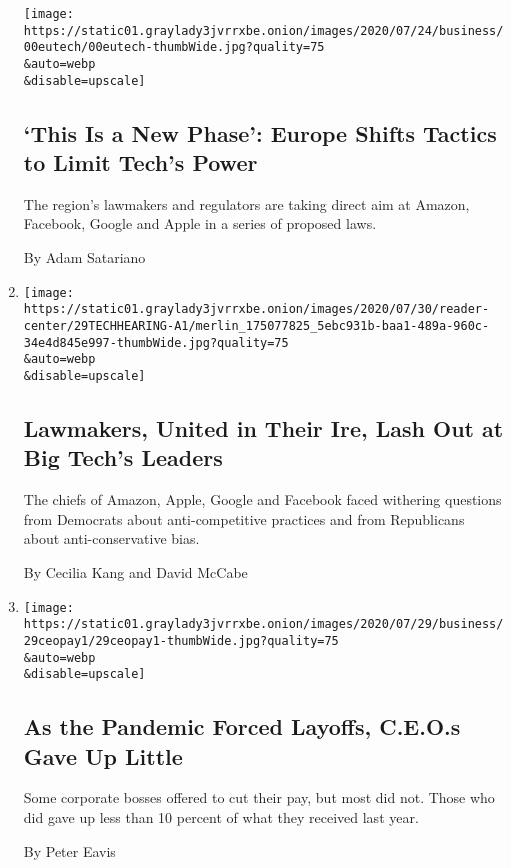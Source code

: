 \begin{enumerate}
  \texttt{[image: https://static01.graylady3jvrrxbe.onion/images/2020/07/24/business/00eutech/00eutech-thumbWide.jpg?quality=75\\\&auto=webp\\\&disable=upscale]}

  \hypertarget{this-is-a-new-phase-europe-shifts-tactics-to-limit-techs-power}{%
  \subsection{`This Is a New Phase': Europe Shifts Tactics to Limit
  Tech's
  Power}\label{this-is-a-new-phase-europe-shifts-tactics-to-limit-techs-power}}

  The region's lawmakers and regulators are taking direct aim at Amazon,
  Facebook, Google and Apple in a series of proposed laws.

  By Adam Satariano
\item
  \href{/2020/07/29/technology/big-tech-hearing-apple-amazon-facebook-google.html}{}

  \texttt{[image: https://static01.graylady3jvrrxbe.onion/images/2020/07/30/reader-center/29TECHHEARING-A1/merlin\_175077825\_5ebc931b-baa1-489a-960c-34e4d845e997-thumbWide.jpg?quality=75\\\&auto=webp\\\&disable=upscale]}

  \hypertarget{lawmakers-united-in-their-ire-lash-out-at-big-techs-leaders}{%
  \subsection{Lawmakers, United in Their Ire, Lash Out at Big Tech's
  Leaders}\label{lawmakers-united-in-their-ire-lash-out-at-big-techs-leaders}}

  The chiefs of Amazon, Apple, Google and Facebook faced withering
  questions from Democrats about anti-competitive practices and from
  Republicans about anti-conservative bias.

  By Cecilia Kang and David McCabe
\item
  \href{/2020/07/29/business/economy/ceo-pay-pandemic-layoffs.html}{}

  \texttt{[image: https://static01.graylady3jvrrxbe.onion/images/2020/07/29/business/29ceopay1/29ceopay1-thumbWide.jpg?quality=75\\\&auto=webp\\\&disable=upscale]}

  \hypertarget{as-the-pandemic-forced-layoffs-ceos-gave-up-little}{%
  \subsection{As the Pandemic Forced Layoffs, C.E.O.s Gave Up
  Little}\label{as-the-pandemic-forced-layoffs-ceos-gave-up-little}}

  Some corporate bosses offered to cut their pay, but most did not.
  Those who did gave up less than 10 percent of what they received last
  year.

  By Peter Eavis
\end{enumerate}

